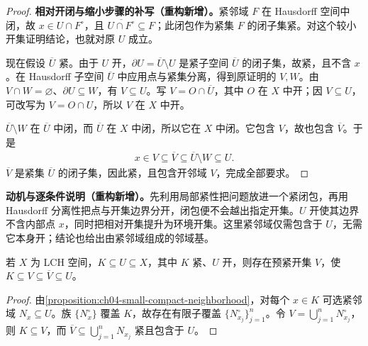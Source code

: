 \documentclass[../../main.tex]{subfiles}%
\begin{document}
\begin{proof}
\textbf{相对开闭与缩小步骤的补写（重构新增）。}紧邻域 $F$ 在 Hausdorff 空间中闭，故 $x\in U\cap F^\circ$，且 $\overline{U\cap F^\circ}\subseteq F$；此闭包作为紧集 $F$ 的闭子集紧。对这个较小开集证明结论，也就对原 $U$ 成立。

现在假设 $\overline U$ 紧。由于 $U$ 开，$\partial U=\overline U\setminus U$ 是紧子空间 $\overline U$ 的闭子集，故紧，且不含 $x$。在 Hausdorff 子空间 $\overline U$ 中应用点与紧集分离，得到原证明的 $V,W$。由 $V\cap W=\varnothing$、$\partial U\subseteq W$，有 $V\subseteq U$。写 $V=O\cap\overline U$，其中 $O$ 在 $X$ 中开；因 $V\subseteq U$，可改写为 $V=O\cap U$，所以 $V$ 在 $X$ 中开。

$\overline U\setminus W$ 在 $\overline U$ 中闭，而 $\overline U$ 在 $X$ 中闭，所以它在 $X$ 中闭。它包含 $V$，故也包含 $\overline V$。于是
\begin{align*}
x\in V\subseteq\overline V\subseteq\overline U\setminus W\subseteq U.
\end{align*}
$\overline V$ 是紧集 $\overline U$ 的闭子集，因此紧，且包含开邻域 $V$，完成全部要求。
\end{proof}
\begin{remark}
\textbf{动机与逐条件说明（重构新增）。}先利用局部紧性把问题放进一个紧闭包，再用 Hausdorff 分离性把点与开集边界分开，闭包便不会越出指定开集。$U$ 开使其边界不含内部点 $x$，同时把相对开集提升为环境开集。这里紧邻域仅需包含于 $U$，无需它本身开；结论也给出由紧邻域组成的邻域基。
\end{remark}
\begin{proposition}\label{proposition:ch04-precompact-neighborhood}
若 $X$ 为 LCH 空间，$K\subseteq U\subseteq X$，其中 $K$ 紧、$U$ 开，则存在预紧开集 $V$，使 $K\subseteq V\subseteq\overline V\subseteq U$。
\end{proposition}
\begin{proof}
由\cref{proposition:ch04-small-compact-neighborhood}，对每个 $x\in K$ 可选紧邻域 $N_x\subseteq U$。族 $\{N_x^\circ\}$ 覆盖 $K$，故存在有限子覆盖 $\{N_{x_j}^\circ\}_{j=1}^n$。令 $V=\bigcup_{j=1}^nN_{x_j}^\circ$，则 $K\subseteq V$，而 $\overline V\subseteq\bigcup_{j=1}^nN_{x_j}$ 紧且包含于 $U$。
\end{proof}
\end{document}
